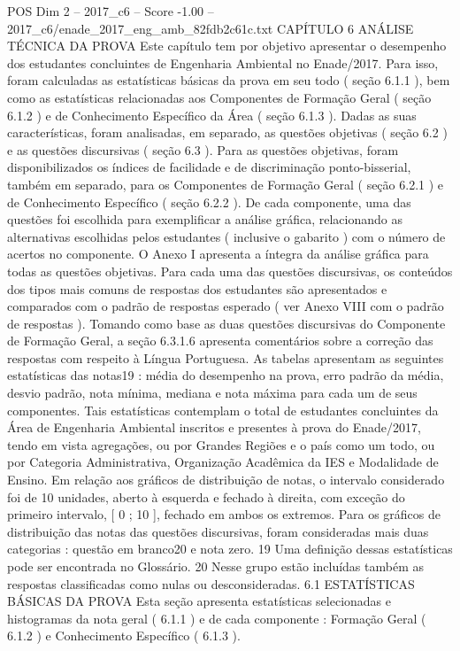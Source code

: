 \begin{textsample}{POS Dim 2 – 2017\_c6 – Score -1.00 – 2017\_c6/enade\_2017\_eng\_amb\_82fdb2c61c.txt}  \label{ex:f2_pos_273}
CAPÍTULO 6 ANÁLISE TÉCNICA DA PROVA Este capítulo tem por objetivo apresentar o desempenho dos estudantes concluintes de Engenharia Ambiental no Enade/2017.
Para isso, foram calculadas as estatísticas básicas da prova em seu todo ( seção 6.1.1 ), bem como as estatísticas relacionadas aos Componentes de Formação Geral ( seção 6.1.2 ) e de Conhecimento Específico da Área ( seção 6.1.3 ).
Dadas as suas características, foram analisadas, em separado, as questões objetivas ( seção 6.2 ) e as questões discursivas ( seção 6.3 ).
Para as questões objetivas, foram disponibilizados os índices de facilidade e de discriminação ponto-bisserial, também em separado, para os Componentes de Formação Geral ( seção 6.2.1 ) e de Conhecimento Específico ( seção 6.2.2 ).
De cada componente, uma das questões foi escolhida para exemplificar a análise gráfica, relacionando as alternativas escolhidas pelos estudantes ( inclusive o gabarito ) com o número de acertos no componente.
O Anexo I apresenta a íntegra da análise gráfica para todas as questões objetivas.
Para cada uma das questões discursivas, os conteúdos dos tipos mais comuns de respostas dos estudantes são apresentados e comparados com o padrão de respostas esperado ( ver Anexo VIII com o padrão de respostas ).
Tomando como base as duas questões discursivas do Componente de Formação Geral, a seção 6.3.1.6 apresenta comentários sobre a correção das respostas com respeito à Língua Portuguesa.
As tabelas apresentam as seguintes estatísticas das notas19 : média do desempenho na prova, erro padrão da média, desvio padrão, nota mínima, mediana e nota máxima para cada um de seus componentes.
Tais estatísticas contemplam o total de estudantes concluintes da Área de Engenharia Ambiental inscritos e presentes à prova do Enade/2017, tendo em vista agregações, ou por Grandes Regiões e o país como um todo, ou por Categoria Administrativa, Organização Acadêmica da IES e Modalidade de Ensino.
Em relação aos gráficos de distribuição de notas, o intervalo considerado foi de 10 unidades, aberto à esquerda e fechado à direita, com exceção do primeiro intervalo, [ 0 ; 10 ], fechado em ambos os extremos.
Para os gráficos de distribuição das notas das questões discursivas, foram consideradas mais duas categorias : questão em branco20 e nota zero. 19 Uma definição dessas estatísticas pode ser encontrada no Glossário. 20 Nesse grupo estão incluídas também as respostas classificadas como nulas ou desconsideradas. 6.1 ESTATÍSTICAS BÁSICAS DA PROVA Esta seção apresenta estatísticas selecionadas e histogramas da nota geral ( 6.1.1 ) e de cada componente : Formação Geral ( 6.1.2 ) e Conhecimento Específico ( 6.1.3 ).

\end{textsample}
